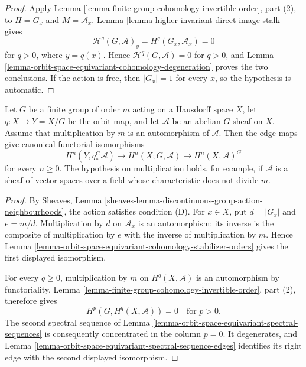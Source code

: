 \begin{proof}
Apply Lemma \ref{lemma-finite-group-cohomology-invertible-order}, part (2),
to $H=G_x$ and $M=\mathcal{A}_x$. Lemma
\ref{lemma-higher-invariant-direct-image-stalk} gives
$$
\mathcal{H}^q(G, \mathcal{A})_y
=
H^q(G_x, \mathcal{A}_x)
=0
$$
for $q>0$, where $y=q(x)$. Hence
$\mathcal{H}^q(G, \mathcal{A})=0$ for $q>0$, and Lemma
\ref{lemma-orbit-space-equivariant-cohomology-degeneration} proves the two
conclusions. If the action is free, then $|G_x|=1$ for every $x$, so the
hypothesis is automatic.
\end{proof}

\begin{lemma}
\label{lemma-orbit-space-equivariant-cohomology-finite-group}
\begin{reference}
\cite[Chapter V, \S 5.2, Corollary to Proposition 5.2.3,
p. 202]{Tohoku}
\end{reference}
Let $G$ be a finite group of order $m$ acting on a Hausdorff space $X$,
let $q : X \to Y=X/G$ be the orbit map, and let $\mathcal{A}$ be an
abelian $G$-sheaf on $X$. Assume that multiplication by $m$ is an
automorphism of $\mathcal{A}$. Then the edge maps give canonical functorial
isomorphisms
$$
H^n(Y, q_*^G\mathcal{A})
\longrightarrow
H^n(X; G, \mathcal{A})
\longrightarrow
H^n(X, \mathcal{A})^G
$$
for every $n \geq 0$. The hypothesis on multiplication holds, for example,
if $\mathcal{A}$ is a sheaf of vector spaces over a field whose
characteristic does not divide $m$.
\end{lemma}

\begin{proof}
By Sheaves, Lemma
\ref{sheaves-lemma-discontinuous-group-action-neighbourhoods}, the action
satisfies condition (D). For $x \in X$, put $d=|G_x|$ and $e=m/d$.
Multiplication by $d$ on $\mathcal{A}_x$ is an automorphism: its inverse is
the composite of multiplication by $e$ with the inverse of multiplication
by $m$. Hence Lemma
\ref{lemma-orbit-space-equivariant-cohomology-stabilizer-orders} gives the
first displayed isomorphism.

For every $q \geq 0$, multiplication by $m$ on
$H^q(X, \mathcal{A})$ is an automorphism by functoriality. Lemma
\ref{lemma-finite-group-cohomology-invertible-order}, part (2), therefore
gives
$$
H^p(G, H^q(X, \mathcal{A})) = 0 \quad\text{for }p>0.
$$
The second spectral sequence of Lemma
\ref{lemma-orbit-space-equivariant-spectral-sequences} is consequently
concentrated in the column $p=0$. It degenerates, and Lemma
\ref{lemma-orbit-space-equivariant-spectral-sequence-edges} identifies its
right edge with the second displayed isomorphism.
\end{proof}

